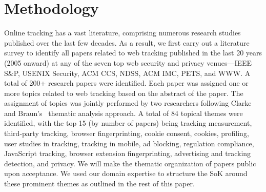 \vspace{-1mm}
\section{Methodology}
\label{sec:methodology}
\vspace{-1mm}

Online tracking has a vast literature, comprising numerous research studies published over the last few decades.
%
As a result, we first carry out a literature survey to identify all papers related to web tracking published in the last 20 years (2005 onward) at any of the seven top web security and privacy venues---IEEE S\&P, USENIX Security, ACM CCS, NDSS, ACM IMC, PETS, and WWW.
%
A total of 200+ research papers were identified. 
%
Each paper was assigned one or more topics related to web tracking based on the abstract of the paper.
%
The assignment of topics was jointly performed by two researchers following Clarke and Braun’s~\cite{clarke2013successful} thematic analysis approach.
%
A total of 84 topical themes were identified, with the top 15 (by number of papers) being tracking measurement, third-party tracking, browser fingerprinting, cookie consent, cookies, profiling, user studies in tracking, tracking in mobile, ad blocking, regulation compliance, JavaScript tracking, browser extension fingerprinting, advertising and tracking detection, and privacy.
%
We will make the thematic organization of papers public upon acceptance.
%
We used our domain expertise to structure the SoK around these prominent themes as outlined in the rest of this paper. 
%
